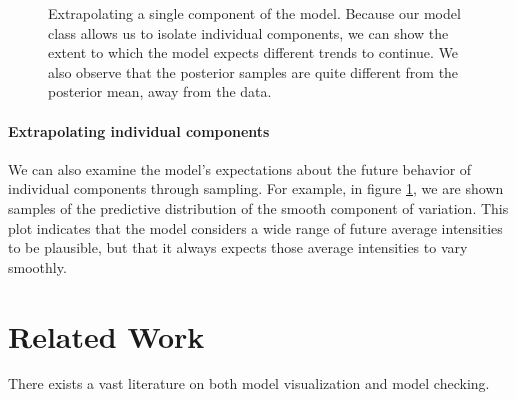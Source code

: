 \documentclass{article} %
\def\ie{i.e.\ }
\begin{document}
\begin{figure}[h!]
\centering
{}
\caption{Extrapolating a single component of the model.  Because our model class allows us to isolate individual components, we can show the extent to which the model expects different trends to continue.  We also observe that the posterior samples are quite different from the posterior mean, away from the data.}
\label{fig:extrap-smooth}
\end{figure}

\paragraph{Extrapolating individual components}
We can also examine the model's expectations about the future behavior of individual components through sampling.  For example, in figure \ref{fig:extrap-smooth}, we are shown samples of the predictive distribution of the smooth component of variation.  This plot indicates that the model considers a wide range of future average intensities to be plausible, but that it always expects those average intensities to vary smoothly.

\section{Related Work}

There exists a vast literature on both model visualization and model checking.


\end{document}
